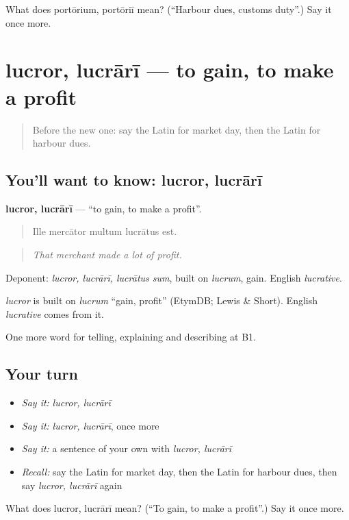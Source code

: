 \begin{tcolorbox}[breakable,colback=teal!4,colframe=teal!35!black,title={Before you move on}]
What does portōrium, portōriī mean? (\textquotedblleft{}Harbour dues, customs duty\textquotedblright{}.) Say it once more.
\end{tcolorbox}
\section[lucror, lucrārī]{lucror, lucrārī — to gain, to make a profit}

\label{lesson:LA-C421-lucror}



\begin{quote}
Before the new one: say the Latin for market day, then the Latin for harbour dues.
\end{quote}

\subsection*{You'll want to know: lucror, lucrārī}
\textbf{lucror, lucrārī} — \textquotedblleft{}to gain, to make a profit\textquotedblright{}.

\begin{quote}
Ille mercātor multum lucrātus est.
\end{quote}

\begin{quote}
\emph{That merchant made a lot of profit.}
\end{quote}

Deponent: \emph{lucror, lucrārī, lucrātus sum}, built on \emph{lucrum}, gain. English \emph{lucrative}.

\begin{cousinweb}
\emph{lucror} is built on \emph{lucrum} \textquotedblleft{}gain, profit\textquotedblright{} (EtymDB; Lewis \& Short). English \emph{lucrative} comes from it.
\end{cousinweb}

\begin{grammarlens}[title={What you've built}]
One more word for telling, explaining and describing at B1.
\end{grammarlens}

\subsection*{Your turn}
\begin{itemize}
\raggedright
  \item \emph{Say it:} \emph{lucror, lucrārī}
  \item \emph{Say it:} \emph{lucror, lucrārī}, once more
  \item \emph{Say it:} a sentence of your own with \emph{lucror, lucrārī}
  \item \emph{Recall:} say the Latin for market day, then the Latin for harbour dues, then say \emph{lucror, lucrārī} again
\end{itemize}

\begin{tcolorbox}[breakable,colback=teal!4,colframe=teal!35!black,title={Before you move on}]
What does lucror, lucrārī mean? (\textquotedblleft{}To gain, to make a profit\textquotedblright{}.) Say it once more.
\end{tcolorbox}
